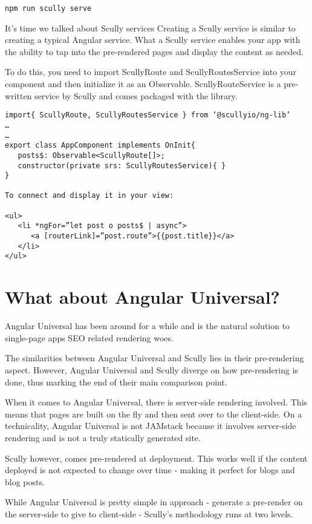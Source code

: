 \begin{verbatim}
npm run scully serve
\end{verbatim}

It’s time we talked about Scully services
Creating a Scully service is similar to creating a typical Angular service. What a Scully service enables your app with the ability to tap into the pre-rendered pages and display the content as needed.

To do this, you need to import ScullyRoute and ScullyRoutesService into your component and then initialize it as an Observable. ScullyRouteService is a pre-written service by Scully and comes packaged with the library.

\begin{lstlisting}
import{ ScullyRoute, ScullyRoutesService } from ‘@scullyio/ng-lib’
…
…
export class AppComponent implements OnInit{
   posts$: Observable<ScullyRoute[]>;
   constructor(private srs: ScullyRoutesService){ }
}

To connect and display it in your view:

<ul>
   <li *ngFor=”let post o posts$ | async”>
      <a [routerLink]=”post.route”>{{post.title}}</a>
   </li>
</ul>
\end{lstlisting}

\section{What about Angular Universal?}
Angular Universal has been around for a while and is the natural solution to single-page apps SEO related rendering woes. 

The similarities between Angular Universal and Scully lies in their pre-rendering aspect. However, Angular Universal and Scully diverge on how pre-rendering is done, thus marking the end of their main comparison point.

When it comes to Angular Universal, there is server-side rendering involved. This means that pages are built on the fly and then sent over to the client-side. On a technicality, Angular Universal is not JAMstack because it involves server-side rendering and is not a truly statically generated site. 

Scully however, comes pre-rendered at deployment. This works well if the content deployed is not expected to change over time - making it perfect for blogs and blog posts.

While Angular Universal is pretty simple in approach - generate a pre-render on the server-side to give to client-side - Scully’s methodology runs at two levels.

